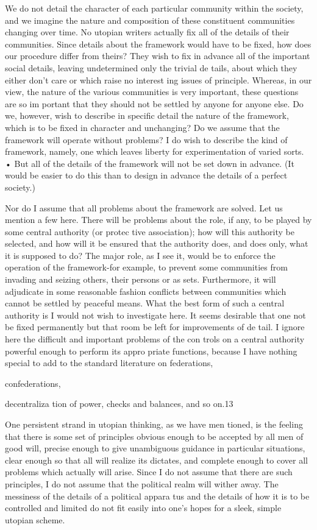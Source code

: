 \documentclass[11pt,openany]{book}
\begin{document}
We do not detail the character of each particular community within the society, and we imagine the nature and composition of these constituent communities changing over time. No utopian writers actually fix all of the details of their communities. Since details about the framework would have to be fixed, how does our procedure differ from theirs? They wish to fix in advance all of the important social details, leaving undetermined only the trivial de tails, about which they either don't care or which raise no interest ing issues of principle. Whereas, in our view, the nature of the various communities is very important, these questions are so im portant that they should not be settled by anyone for anyone else. Do we, however, wish to describe in specific detail the nature of the framework, which is to be fixed in character and unchanging? Do we assume that the framework will operate without problems? I do wish to describe the kind of framework, namely, one which leaves liberty for experimentation of varied sorts. • But all of the details of the framework will not be set down in advance. (It would be easier to do this than to design in advance the details of a perfect society.) 

Nor do I assume that all problems about the framework are solved. Let us mention a few here. There will be problems about the role, if any, to be played by some central authority (or protec tive association); how will this authority be selected, and how will it be ensured that the authority does, and does only, what it is supposed to do? The major role, as I see it, would be to enforce the operation of the framework-for example, to prevent some communities from invading and seizing others, their persons or as sets. Furthermore, it will adjudicate in some reasonable fashion conflicts between communities which cannot be settled by peaceful means. What the best form of such a central authority is I would not wish to investigate here. It seems desirable that one not be fixed permanently but that room be left for improvements of de tail. I ignore here the difficult and important problems of the con trols on a central authority powerful enough to perform its appro priate functions, because I have nothing special to add to the standard literature on federations, 

confederations, 

decentraliza tion of power, checks and balances, and so on.13 

One persistent strand in utopian thinking, as we have men tioned, is the feeling that there is some set of principles obvious enough to be accepted by all men of good will, precise enough to give unambiguous guidance in particular situations, clear enough so that all will realize its dictates, and complete enough to cover all problems which actually will arise. Since I do not assume that there are such principles, I do not assume that the political realm will wither away. The messiness of the details of a political appara tus and the details of how it is to be controlled and limited do not fit easily into one's hopes for a sleek, simple utopian scheme. 
\end{document}
